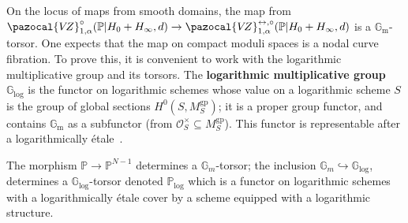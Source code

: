 \documentclass[11pt]{amsart}
\newcommand{\VZ}{\pazocal{V\!Z}}
\newcommand{\OO}{\mathcal{O}}
\renewcommand{\to}{\rightarrow}
\newcommand{\Gm}{\mathbb{G}_{\text{m}}}
\theoremstyle{definition}
\theoremstyle{definition}
\begin{document}
On the locus of maps from smooth domains, the map from $\VZ^\circ_{1,\alpha}(\mathbb P|H_0+H_\infty,d)\to \VZ^{\leftrightarrow,\circ}_{1,\alpha}(\mathbb P|H_0+H_\infty,d)$ is a $\mathbb G_{\operatorname{m}}$-torsor. One expects that the map on compact moduli spaces is a nodal curve fibration. To prove this, it is convenient to work with the logarithmic multiplicative group and its torsors. The \textbf{logarithmic multiplicative group} $\mathbb G_{\mathrm{log}}$ is the functor on logarithmic schemes whose value on a logarithmic scheme $S$ is the group of global sections $H^0(S,M_S^{\mathrm{gp}})$; it is a proper group functor, and contains $\Gm$ as a subfunctor (from $\OO^\times_S\subseteq M_S^{\mathrm{gp}}$). This functor is representable after a logarithmically \'etale~\cite[Proposition~1]{RW19}.

The morphism $\mathbb P \to \mathbb P^{N-1}$ determines a $\mathbb G_m$-torsor; the inclusion $\mathbb G_m\hookrightarrow \mathbb G_{\mathrm{log}}$, determines a $\mathbb G_{\mathrm{log}}$-torsor denoted $\mathbb P_{\mathrm{log}}$ which is a functor on logarithmic schemes with a logarithmically \'etale cover by a scheme equipped with a logarithmic structure. 


\begin{comment}
The bundle $\mathbb P\to \mathbb P^{N-1}$ gives rise to a $\mathbb G_{\operatorname{m}}$-torsor by deleting the zero and infinity sections. Replacing these fibres by their $\mathbb G_{\mathrm{log}}$ compactifications, we obtain a non-representable functor on logarithmic schemes $\mathbb P_{\mathrm{log}}$ and a logarithmically \'etale modification
\[
\mathbb P\to \mathbb P_{\mathrm{log}}.
\]
\end{comment}
\end{document}
